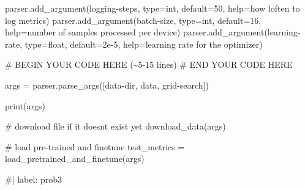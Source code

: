 \documentclass[
  letterpaper,
  DIV=11,
  numbers=noendperiod]{scrartcl}
\newenvironment{Shaded}{\begin{snugshade}}{\end{snugshade}}
\newcommand{\BuiltInTok}[1]{\textcolor[rgb]{0.00,0.23,0.31}{#1}}
\newcommand{\CommentTok}[1]{\textcolor[rgb]{0.37,0.37,0.37}{#1}}
\newcommand{\DecValTok}[1]{\textcolor[rgb]{0.68,0.00,0.00}{#1}}
\newcommand{\FloatTok}[1]{\textcolor[rgb]{0.68,0.00,0.00}{#1}}
\newcommand{\NormalTok}[1]{\textcolor[rgb]{0.00,0.23,0.31}{#1}}
\newcommand{\OperatorTok}[1]{\textcolor[rgb]{0.37,0.37,0.37}{#1}}
\newcommand{\RegionMarkerTok}[1]{\textcolor[rgb]{0.00,0.23,0.31}{#1}}
\newcommand{\StringTok}[1]{\textcolor[rgb]{0.13,0.47,0.30}{#1}}
\begin{document}
\begin{Shaded}
\begin{Highlighting}[]
\NormalTok{parser.add\_argument(}\StringTok{\textquotesingle{}{-}{-}logging{-}steps\textquotesingle{}}\NormalTok{, }\BuiltInTok{type}\OperatorTok{=}\BuiltInTok{int}\NormalTok{, default}\OperatorTok{=}\DecValTok{50}\NormalTok{, }\BuiltInTok{help}\OperatorTok{=}\StringTok{\textquotesingle{}how loften to log metrics\textquotesingle{}}\NormalTok{)}
\NormalTok{parser.add\_argument(}\StringTok{\textquotesingle{}{-}{-}batch{-}size\textquotesingle{}}\NormalTok{, }\BuiltInTok{type}\OperatorTok{=}\BuiltInTok{int}\NormalTok{, default}\OperatorTok{=}\DecValTok{16}\NormalTok{, }\BuiltInTok{help}\OperatorTok{=}\StringTok{\textquotesingle{}number of samples processed per device\textquotesingle{}}\NormalTok{)}
\NormalTok{parser.add\_argument(}\StringTok{\textquotesingle{}{-}{-}learning{-}rate\textquotesingle{}}\NormalTok{, }\BuiltInTok{type}\OperatorTok{=}\BuiltInTok{float}\NormalTok{, default}\OperatorTok{=}\FloatTok{2e{-}5}\NormalTok{, }\BuiltInTok{help}\OperatorTok{=}\StringTok{\textquotesingle{}learning rate for the optimizer\textquotesingle{}}\NormalTok{)}


\CommentTok{\# }\RegionMarkerTok{BEGIN}\CommentTok{ YOUR CODE HERE (\textasciitilde{}5{-}15 lines)}
\CommentTok{\# }\RegionMarkerTok{END}\CommentTok{ YOUR CODE HERE}

\NormalTok{args }\OperatorTok{=}\NormalTok{ parser.parse\_args([}\StringTok{\textquotesingle{}{-}{-}data{-}dir\textquotesingle{}}\NormalTok{, }\StringTok{\textquotesingle{}data\textquotesingle{}}\NormalTok{, }\StringTok{\textquotesingle{}{-}{-}grid{-}search\textquotesingle{}}\NormalTok{])}

\BuiltInTok{print}\NormalTok{(args)}

\CommentTok{\# download file if it doesn\textquotesingle{}t exist yet}
\NormalTok{download\_data(args)}

\CommentTok{\# load pre{-}trained and finetune}
\NormalTok{test\_metrics }\OperatorTok{=}\NormalTok{ load\_pretrained\_and\_finetune(args)}



\CommentTok{\#| label: prob3}


\end{Highlighting}
\end{Shaded}
\end{document}
